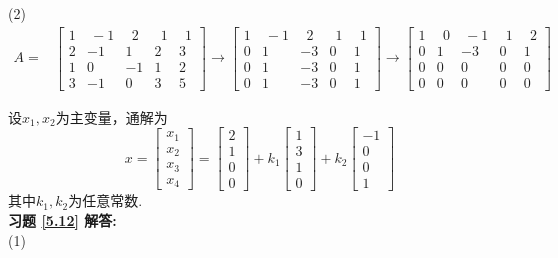 \documentclass[a4paper]{book}
\begin{document}
(2)
\begin{displaymath}
\begin{aligned}
A=&\begin{bmatrix}1&\ -1&\ \ 2&\ \ 1&\ \ 1\\2&-1&1&2&3\\1&0&-1&1&2\\3&-1&0&3&5  \end{bmatrix}\rightarrow
\begin{bmatrix}1&\ -1&\ \ 2&\ \ 1&\ \ 1\\0&1&-3&0&1\\0&1&-3&0&1\\0&1&-3&0&1  \end{bmatrix}\rightarrow
\begin{bmatrix}1&\ \ 0&\ -1&\ \ 1&\ \ 2\\0&1&-3&0&1\\0&0&0&0&0\\0&0&0&0&0  \end{bmatrix}
\end{aligned} \end{displaymath}

设$x_1,x_2$为主变量，通解为
\begin{displaymath}
x=\begin{bmatrix}x_1\\x_2\\x_3\\x_4\end{bmatrix}=\begin{bmatrix}2\\1\\0\\0\end{bmatrix}
+k_1\begin{bmatrix}1\\3\\1\\0\end{bmatrix}+k_2\begin{bmatrix}-1\\0\\0\\1\end{bmatrix}
\end{displaymath}
其中$k_1,k_2$为任意常数.\\
\textbf{习题 \ref{5.12} 解答:}\\
(1)
\end{document}
